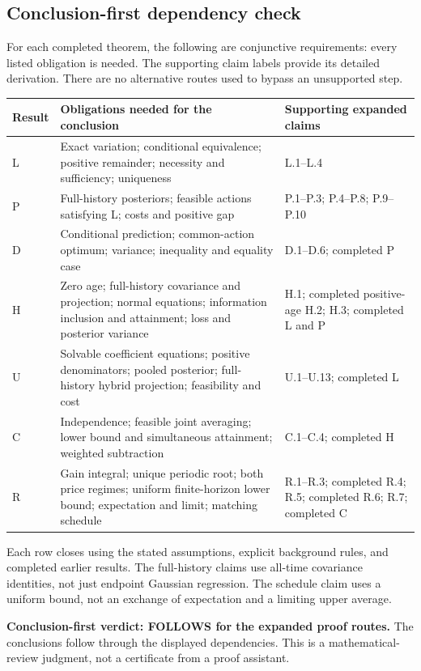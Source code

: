 \documentclass[12pt,letterpaper]{article}
\begin{document}
\subsection{Conclusion-first dependency check}
For each completed theorem, the following are conjunctive requirements: every listed obligation is needed. The supporting claim labels provide its detailed derivation. There are no alternative routes used to bypass an unsupported step.
\begin{longtable}{>{\raggedright\arraybackslash}p{.09\linewidth}>{\raggedright\arraybackslash}p{.49\linewidth}>{\raggedright\arraybackslash}p{.32\linewidth}}
\toprule Result & Obligations needed for the conclusion & Supporting expanded claims \\
\midrule\endhead
L & Exact variation; conditional equivalence; positive remainder; necessity and sufficiency; uniqueness & L.1--L.4 \\
P & Full-history posteriors; feasible actions satisfying L; costs and positive gap & P.1--P.3; P.4--P.8; P.9--P.10 \\
D & Conditional prediction; common-action optimum; variance; inequality and equality case & D.1--D.6; completed P \\
H & Zero age; full-history covariance and projection; normal equations; information inclusion and attainment; loss and posterior variance & H.1; completed positive-age H.2; H.3; completed L and P \\
U & Solvable coefficient equations; positive denominators; pooled posterior; full-history hybrid projection; feasibility and cost & U.1--U.13; completed L \\
C & Independence; feasible joint averaging; lower bound and simultaneous attainment; weighted subtraction & C.1--C.4; completed H \\
R & Gain integral; unique periodic root; both price regimes; uniform finite-horizon lower bound; expectation and limit; matching schedule & R.1--R.3; completed R.4; R.5; completed R.6; R.7; completed C \\
\bottomrule
\end{longtable}
Each row closes using the stated assumptions, explicit background rules, and completed earlier results. The full-history claims use all-time covariance identities, not just endpoint Gaussian regression. The schedule claim uses a uniform bound, not an exchange of expectation and a limiting upper average.

\textbf{Conclusion-first verdict: FOLLOWS for the expanded proof routes.} The conclusions follow through the displayed dependencies. This is a mathematical-review judgment, not a certificate from a proof assistant.
\end{document}
